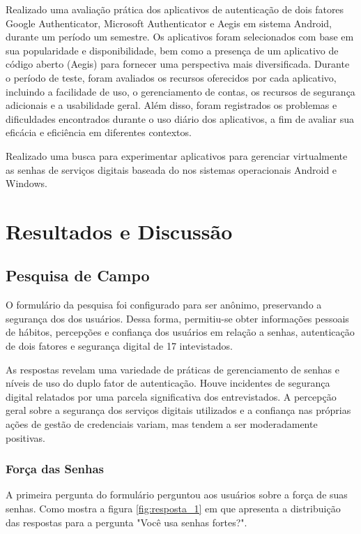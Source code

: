 \documentclass[12pt]{article}
\begin{document}
Realizado uma avaliação prática dos aplicativos de autenticação de dois
fatores Google Authenticator, Microsoft Authenticator e Aegis em sistema
Android, durante um período um semestre. Os aplicativos foram selecionados
com base em sua popularidade e disponibilidade, bem como a presença de um
aplicativo de código aberto (Aegis) para fornecer uma perspectiva mais
diversificada.
Durante o período de teste, foram avaliados os recursos oferecidos por cada
aplicativo, incluindo a facilidade de uso, o gerenciamento de contas, os
recursos de segurança adicionais e a usabilidade geral.
Além disso, foram registrados os problemas e dificuldades encontrados
durante o uso diário dos aplicativos, a fim de avaliar sua eficácia e
eficiência em diferentes contextos.

Realizado uma busca para experimentar aplicativos para gerenciar
virtualmente as senhas de serviços digitais baseada do nos sistemas
operacionais Android e Windows.

\section{Resultados e Discussão}

\subsection{Pesquisa de Campo}

O formulário da pesquisa foi configurado para ser anônimo, preservando a segurança dos
dos usuários.
Dessa forma, permitiu-se obter informações pessoais de hábitos, percepções e confiança
dos usuários em relação a senhas, autenticação de dois fatores e segurança digital de
17 intevistados.

As respostas revelam uma variedade de práticas de gerenciamento de senhas e níveis
de uso do duplo fator de autenticação.
Houve incidentes de segurança digital relatados por uma parcela significativa dos
entrevistados.
A percepção geral sobre a segurança dos serviços digitais utilizados e a confiança
nas próprias ações de gestão de credenciais variam, mas tendem a ser moderadamente
positivas.

\subsubsection{Força das Senhas}

A primeira pergunta do formulário perguntou aos usuários sobre a força de suas senhas.
Como mostra a figura \ref{fig:resposta_1} em que apresenta a distribuição das
respostas para a pergunta "Você usa senhas fortes?".
\end{document}
